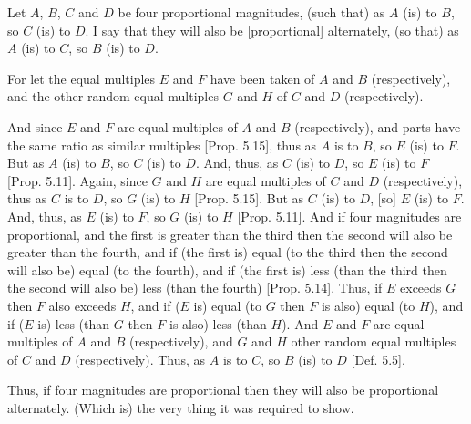 \begin{Parallel}{}{}
{Let $A$, $B$, $C$ and $D$ be four proportional magnitudes, (such that) as $A$
(is) to $B$, so $C$ (is) to $D$. I say that they will also be [proportional]
 alternately, (so that) as $A$ (is) to $C$, so $B$ (is) to $D$.
 
For let the equal multiples $E$ and $F$ have been taken of $A$ and $B$ (respectively),
and the other random equal multiples $G$ and $H$ of $C$ and $D$ (respectively).

\epsfysize=1in
\centerline{}

And since $E$ and $F$ are equal multiples of $A$ and $B$ (respectively),
and parts  have the same ratio as similar multiples [Prop. 5.15], thus as $A$ is to $B$, so $E$ (is) to $F$.
But as $A$ (is) to $B$, so $C$ (is) to $D$. And, thus, as $C$ (is) to $D$, so
$E$ (is) to $F$ [Prop. 5.11].
Again, since $G$ and $H$ are equal multiples of $C$ and $D$ (respectively),  thus
as $C$  is to $D$, so $G$ (is) to $H$ [Prop. 5.15].
But as $C$ (is) to $D$, [so] $E$ (is) to $F$. And, thus, as $E$ (is) to $F$, so
$G$ (is) to $H$ [Prop. 5.11]. And if four magnitudes are proportional, and the first is greater than the third then
the second will also be greater than the fourth, and if (the first is) equal
(to the third then the second will also be) equal (to the fourth), and if
(the first is) less (than the third then the second will also be) less (than the fourth)
[Prop. 5.14]. Thus, if $E$ exceeds $G$ then
$F$ also exceeds $H$, and if ($E$ is) equal (to $G$ then $F$ is also) equal (to $H$), and if
($E$ is) less (than $G$ then $F$ is also) less (than $H$). And $E$ and $F$ are equal multiples of $A$ and $B$ (respectively), and $G$ and $H$ other random equal multiples
of $C$ and $D$ (respectively). Thus, as $A$ is to $C$, so $B$ (is) to $D$ [Def. 5.5].

Thus, if four magnitudes are proportional then they will
also be proportional  alternately. (Which is) the very thing it was required to show.}
\end{Parallel}


\vspace{7pt}{\footnotesize \noindent$^\dag$ In modern notation, this proposition
reads that if $\alpha:\beta::\gamma:\delta$ then $\alpha:\gamma::\beta:\delta$.}

